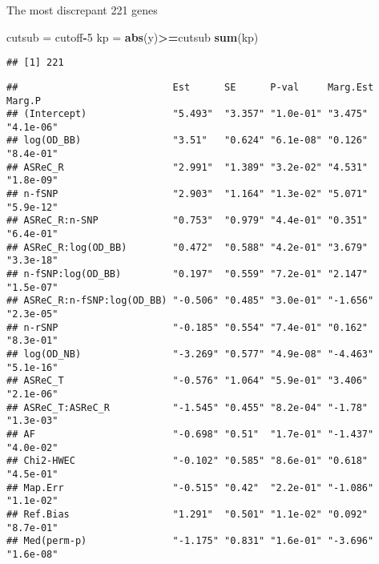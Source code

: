 \documentclass[]{article}
\newenvironment{Shaded}{\begin{snugshade}}{\end{snugshade}}
\newcommand{\KeywordTok}[1]{\textcolor[rgb]{0.13,0.29,0.53}{\textbf{#1}}}
\newcommand{\DecValTok}[1]{\textcolor[rgb]{0.00,0.00,0.81}{#1}}
\newcommand{\StringTok}[1]{\textcolor[rgb]{0.31,0.60,0.02}{#1}}
\newcommand{\OperatorTok}[1]{\textcolor[rgb]{0.81,0.36,0.00}{\textbf{#1}}}
\newcommand{\NormalTok}[1]{#1}
\begin{document}
The most discrepant 221 genes

\begin{Shaded}
\begin{Highlighting}[]
\NormalTok{cutsub =}\StringTok{ }\NormalTok{cutoff}\OperatorTok{-}\DecValTok{5}
\NormalTok{kp =}\StringTok{ }\KeywordTok{abs}\NormalTok{(y)}\OperatorTok{>=}\NormalTok{cutsub}
\KeywordTok{sum}\NormalTok{(kp)}
\end{Highlighting}
\end{Shaded}

\begin{verbatim}
## [1] 221
\end{verbatim}

\begin{Shaded}
\end{Shaded}

\begin{verbatim}
##                           Est      SE      P-val     Marg.Est Marg.P   
## (Intercept)               "5.493"  "3.357" "1.0e-01" "3.475"  "4.1e-06"
## log(OD_BB)                "3.51"   "0.624" "6.1e-08" "0.126"  "8.4e-01"
## ASReC_R                   "2.991"  "1.389" "3.2e-02" "4.531"  "1.8e-09"
## n-fSNP                    "2.903"  "1.164" "1.3e-02" "5.071"  "5.9e-12"
## ASReC_R:n-SNP             "0.753"  "0.979" "4.4e-01" "0.351"  "6.4e-01"
## ASReC_R:log(OD_BB)        "0.472"  "0.588" "4.2e-01" "3.679"  "3.3e-18"
## n-fSNP:log(OD_BB)         "0.197"  "0.559" "7.2e-01" "2.147"  "1.5e-07"
## ASReC_R:n-fSNP:log(OD_BB) "-0.506" "0.485" "3.0e-01" "-1.656" "2.3e-05"
## n-rSNP                    "-0.185" "0.554" "7.4e-01" "0.162"  "8.3e-01"
## log(OD_NB)                "-3.269" "0.577" "4.9e-08" "-4.463" "5.1e-16"
## ASReC_T                   "-0.576" "1.064" "5.9e-01" "3.406"  "2.1e-06"
## ASReC_T:ASReC_R           "-1.545" "0.455" "8.2e-04" "-1.78"  "1.3e-03"
## AF                        "-0.698" "0.51"  "1.7e-01" "-1.437" "4.0e-02"
## Chi2-HWEC                 "-0.102" "0.585" "8.6e-01" "0.618"  "4.5e-01"
## Map.Err                   "-0.515" "0.42"  "2.2e-01" "-1.086" "1.1e-02"
## Ref.Bias                  "1.291"  "0.501" "1.1e-02" "0.092"  "8.7e-01"
## Med(perm-p)               "-1.175" "0.831" "1.6e-01" "-3.696" "1.6e-08"
\end{verbatim}
\end{document}
